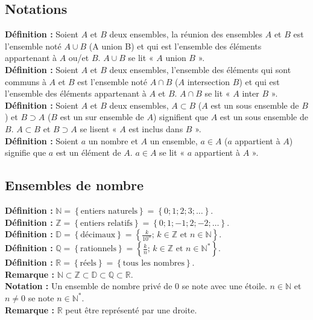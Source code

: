 \documentclass[a4paper,titlepage]{article}
\begin{document}
    \subsection{Notations}
        \textbf{Définition :} Soient $A$ et $B$ deux ensembles, la réunion des ensembles $A$ et $B$ est l’ensemble noté $A\cup B$ (A union B) et qui est l’ensemble des éléments appartenant à $A$ ou/et $B$. $A\cup B$ se lit « $A$ union $B$ ».
        \\
        \textbf{Définition :} Soient $A$ et $B$ deux ensembles, l’ensemble des éléments qui sont communs à $A$ et $B$ est l’ensemble noté $A\cap B$ ($A$ intersection $B$) et qui est l’ensemble des éléments appartenant à $A$ et $B$. $A\cap B$ se lit « $A$ inter $B$ ».
        \\
        \textbf{Définition :} Soient $A$ et $B$ deux ensembles, $A\subset B$ ($A$ est un sous ensemble de $B$) et $B\supset A$ ($B$ est un sur ensemble de $A$) signifient que $A$ est un sous ensemble de $B$. $A\subset B$ et $B\supset A$ se lisent « $A$ est inclus dans $B$ ».
        \\
        \textbf{Définition :} Soient $a$ un nombre et $A$ un ensemble, $a\in A$ ($a$ appartient à $A$) signifie que $a$ est un élément de $A$. $a\in A$ se lit « $a$ appartient à $A$ ».
    \subsection{Ensembles de nombre}
        \textbf{Définition :} $\mathbb{N}=\left\{\text{entiers naturels}\right\}=\left\{0;1;2;3;\ldots\right\}$.
        \\
        \textbf{Définition :} $\mathbb{Z}=\left\{\text{entiers relatifs}\right\}=\left\{0;1;-1;2;-2;\ldots\right\}$.
        \\
        \textbf{Définition :} $\mathbb{D}=\left\{\text{décimaux}\right\}=\left\{\frac{k}{10^{n}}\text{; }k\in\mathbb{Z}\text{ et }n\in\mathbb{N}\right\}$.
        \\
        \textbf{Définition :} $\mathbb{Q}=\left\{\text{rationnels}\right\}=\left\{\frac{k}{n}\text{; }k\in\mathbb{Z}\text{ et }n\in\mathbb{N}^{*}\right\}$.
        \\
        \textbf{Définition :} $\mathbb{R}=\left\{\text{réels}\right\}=\left\{\text{tous les nombres}\right\}$.
        \\
        \textbf{Remarque :} $\mathbb{N}\subset\mathbb{Z}\subset\mathbb{D}\subset\mathbb{Q}\subset\mathbb{R}$.
        \\
        \textbf{Notation :} Un ensemble de nombre privé de $0$ se note avec une étoile. $n\in\mathbb{N}$ et $n\neq 0$ se note $n\in\mathbb{N}^{*}$.
        \\
        \textbf{Remarque :} $\mathbb{R}$ peut être représenté par une droite.
\end{document}
